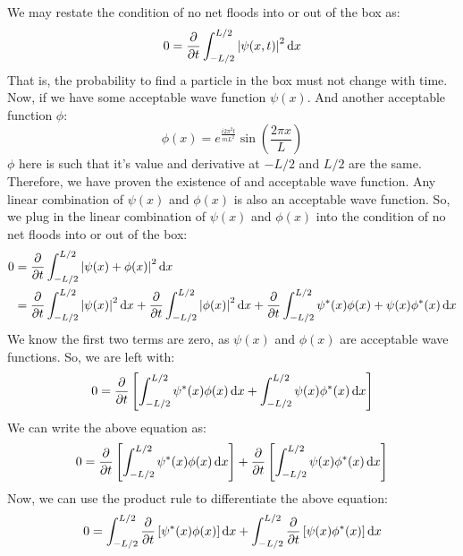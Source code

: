 \documentclass[12pt]{article}
\begin{document}
\subsection{}
We may restate the condition of no net floods into or out of the box as:
\begin{equation}
  0=\pdv{t}\int_{-L / 2}^{L / 2} \abs{\psi(x, t)}^{2} \dd{x}
\end{equation}
That is, the probability to find a particle in the box must not change with time.
Now, if we have some acceptable wave function $\psi(x)$.
And another acceptable function $\phi $:
\begin{equation}
  \phi (x)=e^{\frac{i2\pi^2t}{mL^2}}\sin\left(\frac{2\pi x}{L}\right)
\end{equation}
$\phi$ here is such that it's value and derivative at $-L/2$ and $L/2$ are the same. Therefore, we have proven the existence of and acceptable wave function.
Any linear combination of $\psi(x)$ and $\phi(x)$ is also an acceptable wave function.
So, we plug in the linear combination of $\psi(x)$ and $\phi(x)$ into the condition of no net floods into or out of the box:
\begin{equation}
  \begin{aligned}
    0&=\pdv{t}\int_{-L / 2}^{L / 2} \abs{\psi(x)+\phi(x)}^{2} \dd{x}\\
    &=\pdv{t}\int_{-L / 2}^{L / 2} \abs{\psi(x)}^{2} \dd{x}+\pdv{t}\int_{-L / 2}^{L / 2} \abs{\phi(x)}^{2} \dd{x}+\pdv{t}\int_{-L / 2}^{L / 2}\psi^*(x)\phi(x)+\psi(x)\phi^*(x) \dd{x}\\
\end{aligned}
\end{equation}
We know the first two terms are zero, as $\psi(x)$ and $\phi(x)$ are acceptable wave functions. So, we are left with:
\begin{equation}
  0=\pdv{t}\left[\int_{-L / 2}^{L / 2} \psi^*(x)\phi(x)\dd{x}+\int_{-L / 2}^{L / 2} \psi(x)\phi^*(x) \dd{x}\right]
\end{equation}
We can write the above equation as:
\begin{equation}
  0=\pdv{t}\left[\int_{-L / 2}^{L / 2} \psi^*(x)\phi(x)\dd{x}\right]+\pdv{t}\left[\int_{-L / 2}^{L / 2} \psi(x)\phi^*(x) \dd{x}\right]
\end{equation}
Now, we can use the product rule to differentiate the above equation:
\begin{equation}
  0=\int_{-L / 2}^{L / 2} \pdv{t}\left[\psi^*(x)\phi(x)\right]\dd{x}+\int_{-L / 2}^{L / 2} \pdv{t}\left[\psi(x)\phi^*(x)\right] \dd{x}
\end{equation}
\end{document}
